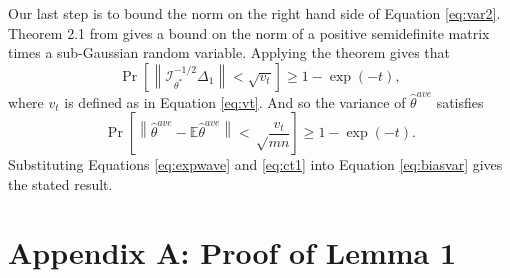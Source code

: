 \documentclass[twoside]{article}
\DeclareMathOperator*{\tr}{tr}
\newcommand{\E}{\mathbb{E}}
\newcommand{\w}{\theta}
\newcommand{\wave}{\hat\w^{ave}}
\newcommand{\wtave}{\E\hat\w^{ave}}
\newcommand{\wstar}{{\w^{*}}}
\newcommand{\I}{\mathcal I}
\newcommand{\ltwo}[1]{{\lVert {#1} \rVert}}
\newcommand{\ltwobig}[1]{{\left\lVert {#1} \right\rVert}}
\newcommand{\prob}[1]{\Pr\left[{#1}\right]}
\begin{document}
Our last step is to bound the norm on the right hand side of Equation \ref{eq:var2}.
Theorem 2.1 from \cite{hsu2012tail} gives a bound on the norm of a positive semidefinite matrix times a sub-Gaussian random variable.
Applying the theorem gives that %
\begin{equation}
\prob{
    \ltwobig{\I^{-1/2}_\wstar\Delta_1} < \sqrt{v_t}
}
\ge 1-\exp(-t)
,
\end{equation}
where $v_t$ is defined as in Equation \ref{eq:vt}.
And so the variance of $\wave$ satisfies
\begin{equation}
\prob{
\ltwobig{\wave-\E\wave}
<
\sqrt\frac{v_t}{{mn}}
}
\ge 1-\exp(-t)
.
\label{eq:ct1}
\end{equation}
Substituting Equations \ref{eq:expwave} and \ref{eq:ct1} into Equation \ref{eq:biasvar} gives the stated result.

\section*{Appendix A: Proof of Lemma 1}
\end{document}
